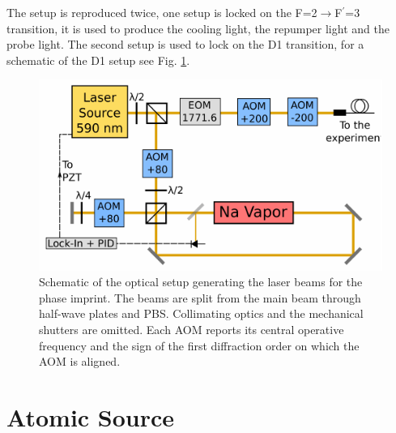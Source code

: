\documentclass[../thesis.tex]{subfiles}
\begin{document}
The setup is reproduced twice, one setup is locked on the F=2$\rightarrow$F$^\prime$=3 transition, it is used to produce the cooling light, the repumper light and the probe light. The second setup is used to lock on the D1 transition, for a schematic of the D1 setup see Fig. \ref{fig:d1_table}.

\begin{figure}[!htb]
\centering
\includegraphics[scale=1.2]{d1_schematic.pdf}
\caption{Schematic of the optical setup generating the laser beams for the phase imprint. The beams are split from the main beam through half-wave plates and PBS. Collimating optics and the mechanical shutters are omitted. Each AOM reports its central operative frequency and the sign of the first diffraction order on which the AOM is aligned.}
\label{fig:d1_table}
\end{figure}
 

\section{Atomic Source}
\end{document}
